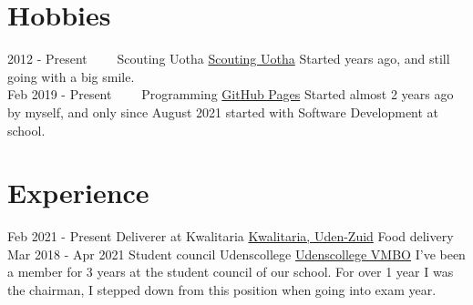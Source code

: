\documentclass[letterpaper]{twentysecondcv} %
\begin{document}
\section{Hobbies}

\begin{twenty} %
	\twentyitem
    	{2012 -}
        {Present~~~~}
        {Scouting Uotha}
        {\href{https://www.uotha.nl/}{Scouting Uotha}}
        {}
        { Started years ago, and still going with a big smile.}\\
	\twentyitem
    	{Feb 2019 -}
        {Present~~~~}
        {Programming}
        {\href{https://tais993.github.io/}{GitHub Pages}}
        {}
        {Started almost 2 years ago by myself, and only since August 2021 started with Software Development at school.}
\end{twenty}

\vspace{6mm}



\section{Experience}
\begin{twenty} %
	\twentyitem
    		{Feb 2021 -}
		{Present}
        		{Deliverer at Kwalitaria}
        		{\href{https://kwalitaria.nl/uden-zuid/uden-zuid/}{Kwalitaria, Uden-Zuid}}
        		{}
        		{Food delivery}\\
		\twentyitem
    		{Mar 2018 -}
		{Apr 2021}
        		{Student council Udenscollege}
        		{\href{https://www.udenscollege.nl/vmbo/startpagina-vmbo/}{Udenscollege VMBO}}
        		{}
        		{
        		    I've been a member for 3 years at the student council of our school.
        		    For over 1 year I was the chairman, I stepped down from this position when going into exam year.
        		}
\end{twenty}

\vspace{6mm}
\end{document}
